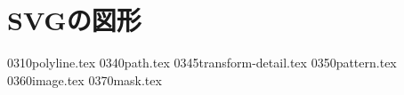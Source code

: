 \chapter{SVGの図形}
 \CH 0310polyline.tex
 \CH 0340path.tex
 \CH 0345transform-detail.tex
 \CH 0350pattern.tex
 \CH 0360image.tex
 \CH 0370mask.tex
